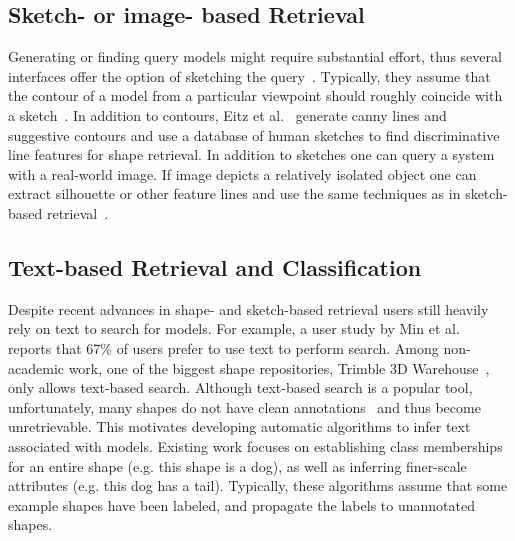 


\subsection{Sketch- or image- based Retrieval}
Generating or finding query models might require substantial effort, thus several interfaces offer the option of sketching the query~\cite{Funkhouser:2003:ASE}. Typically, they assume that the contour of a model from a particular viewpoint should roughly coincide with a sketch~\cite{Lee:2008:sbsc}. In addition to contours, Eitz et al.~\cite{Eitz:2012:sbsr} generate canny lines and suggestive contours and use a database of human sketches to find discriminative line features for shape retrieval.  In addition to sketches one can query a system with a real-world image. If image depicts a relatively isolated object one can extract silhouette or other feature lines and use the same techniques as in sketch-based retrieval~\cite{Xu:2011:PMO}.


\subsection{Text-based Retrieval and Classification}
\label{sec:classText}
Despite recent advances in shape- and sketch-based retrieval users still heavily rely on text to search for models. For example, a user study by Min et al.~\cite{Min:2003:EEW} reports that 67\% of users prefer to use text to perform search. Among non-academic work, one of the biggest shape repositories, Trimble 3D Warehouse~\cite{warehouse}, only allows text-based search. Although text-based search is a popular tool, unfortunately, many shapes do not have clean annotations~\cite{Min:2004:ACO} and thus become unretrievable. This motivates developing automatic algorithms to infer text associated with models. Existing work focuses on establishing class memberships for an entire shape (e.g. this shape is a dog), as well as inferring finer-scale attributes (e.g. this dog has a tail). Typically, these algorithms assume that some example shapes have been labeled, and propagate the labels to unannotated shapes.

